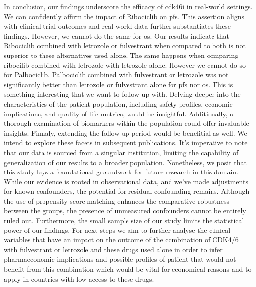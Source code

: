 In conclusion, our findings underscore the efficacy of \ac{cdk46i} in real-world settings. We can confidently affirm the impact of Ribociclib on \ac{pfs}. This assertion aligns with clinical trial outcomes and real-world data further substantiates these findings. However, we cannot do the same for \ac{os}. Our results indicate that Ribociclib combined with letrozole or fulvestrant when compared to both is not superior to these alternatives used alone. The same happens when comparing ribocilib combined with letrozole with letrozole alone. 
However we cannot do so for Palbociclib. Palbociclib combined with fulvestrant or letrozole was not significantly better than letrozole or fulvestrant alone for \ac{pfs} nor \ac{os}. This is something interesting that we want to follow up with.
Delving deeper into the characteristics of the patient population, including safety profiles, economic implications, and quality of life metrics, would be insightful. Additionally, a thorough examination of biomarkers within the population could offer invaluable insights. Finnaly, extending the follow-up period would be benefitial as well. We intend to explore these facets in subsequent publications.
It’s imperative to note that our data is sourced from a singular institution, limiting the capability of generalization of our results to a broader population. Nonetheless, we posit that this study lays a foundational groundwork for future research in this domain. While our evidence is rooted in observational data, and we’ve made adjustments for known confounders, the potential for residual confounding remains. Although the use of propensity score matching enhances the comparative robustness between the groups, the presence of unmeasured confounders cannot be entirely ruled out. Furthermore, the small sample size of our study limits the statistical power of our findings. For next steps we aim to further analyse the clinical variables that have an impact on the outcome of the combination of CDK4/6 with fulvestrant or letrozole and these drugs used alone in order to infer pharmaeconomic implications and possible profiles of patient that would not benefit from this combination which would be vital for economical reasons and to apply in countries with low access to these drugs.